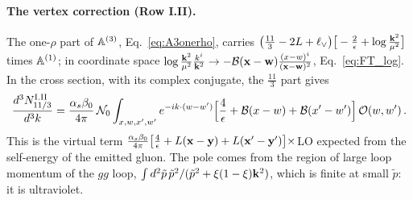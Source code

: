 \paragraph{The vertex correction (Row I.II).} The one-$\rho$ part of $\mathbb{A}^{(3)}$, Eq.~\eqref{eq:A3onerho}, carries $\big(\frac{11}{3}-2L+\ell_\vee\big)\big[-\frac{2}{\epsilon}+\log\frac{\mathbf{k}^2}{\mu^2}\big]$ times $\mathbb{A}^{(1)}$; in coordinate space $\log\frac{\mathbf{k}^2}{\mu^2}\frac{k^i}{\mathbf{k}^2}\to-\mathcal B(\mathbf{x}-\mathbf{w})\frac{(x-w)^i}{(\mathbf{x}-\mathbf{w})^2}$, Eq.~\eqref{eq:FT_log}. In the cross section, with its complex conjugate, the $\frac{11}{3}$ part gives
\begin{align}\label{eq:dg_II}
\frac{d^3N^{\rm I.II}_{11/3}}{d^3k}=\frac{\alpha_s\beta_0}{4\pi}\,\mathcal N_0\int_{x,w,x',w'}e^{-ik\cdot(w-w')}\Big[\frac{4}{\epsilon}+\mathcal B(x-w)+\mathcal B(x'-w')\Big]\,\mathcal O(w,w')\,.
\end{align}
This is the virtual term $\frac{\alpha_s\beta_0}{4\pi}\big[\frac4\epsilon+L(\mathbf{x}-\mathbf{y})+L(\mathbf{x}'-\mathbf{y}')\big]\times$LO expected from the self-energy of the emitted gluon. The pole comes from the region of large loop momentum of the $gg$ loop, $\int d^2\tilde p\,\tilde p^2/(\tilde p^2+\xi(1-\xi)\mathbf{k}^2)$, which is finite at small $\tilde p$: it is ultraviolet.

